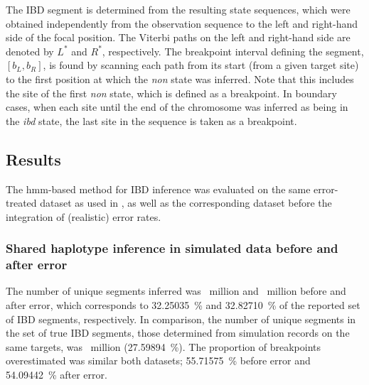 The IBD segment is determined from the  resulting state sequences, which were obtained independently from the observation sequence to the left and right-hand side of the focal position.
The Viterbi paths on the left and right-hand side are denoted by $L^\ast$ and $R^\ast$, respectively.
The breakpoint interval defining the segment, ${[b_L, b_R]}$, is found by scanning each path from its start (\ie from a given target site) to the first position at which the \emph{non} state was inferred.
Note that this includes the site of the first \emph{non} state, which is defined as a breakpoint.
In boundary cases, when each site until the end of the chromosome was inferred as being in the \emph{ibd} state, the last site in the sequence is taken as a breakpoint.





%
\subsection{Results}
%


The \gls{hmm}-based method for IBD inference was evaluated on the same error-treated dataset as used in , as well as the corresponding dataset before the integration of (realistic) error rates.


%
\subsubsection{Shared haplotype inference in simulated data before and after error}
%

The number of unique segments inferred was
~million and
~million before and after error, which corresponds to
\SI{32.25035}{\percent} and
\SI{32.82710}{\percent} of the reported set of IBD segments, respectively.
In comparison, the number of unique segments in the set of true IBD segments, those determined from simulation records on the same targets, was
~million (\SI{27.59894}{\percent}).
The proportion of breakpoints overestimated  was similar  both datasets;
\SI{55.71575}{\percent} before error and
\SI{54.09442}{\percent} after error.

